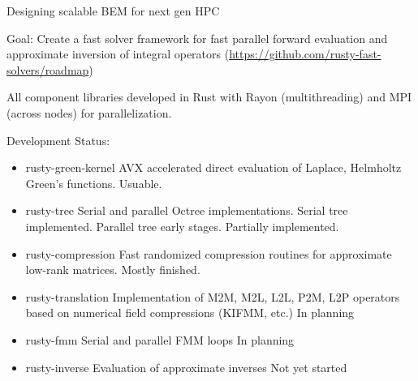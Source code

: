 \documentclass[dvipsnames,10pt]{beamer}
\begin{document}
\begin{frame}{Designing scalable BEM for next gen HPC}
	
    \vspace{.2cm}
Goal: Create a fast solver framework for fast parallel forward evaluation and
approximate inversion of integral operators (\url{https://github.com/rusty-fast-solvers/roadmap})

\vspace{\baselineskip} 

{\color{blue} All component libraries developed in Rust with Rayon (multithreading)
	and MPI (across nodes) for parallelization.}
\vspace{\baselineskip}

Development Status:
\begin{itemize}
	\item {\color{blue} rusty-green-kernel} AVX accelerated direct evaluation
	of Laplace, Helmholtz Green's functions. {\color{green} Usuable}.
	\item {\color{blue} rusty-tree} Serial and parallel Octree implementations.
	Serial tree implemented. 
	Parallel tree early stages. {\color{yellow} Partially implemented}.
	\item {\color{blue} rusty-compression} Fast randomized compression routines
	for approximate low-rank matrices. {\color{yellow} Mostly finished.}
	\item {\color{blue} rusty-translation} Implementation of M2M, 
	M2L, L2L, P2M, L2P operators
	based on numerical field compressions (KIFMM, etc.)
	{\color{red} In planning}
	\item {\color{blue} rusty-fmm} Serial and parallel FMM loops 
	{\color{red} In planning}
	\item {\color{blue} rusty-inverse} Evaluation of approximate inverses 
	{\color{red} Not yet started}
\end{itemize}

\end{frame}
	
\end{document}

